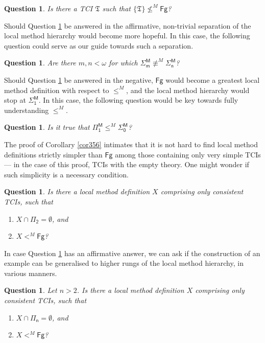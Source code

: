 \documentclass[12pt, twoside]{memoir}
\numberwithin{equation}{section}
\newtheorem{ques}[thm]{Question}
\theoremstyle{definition}
\theoremstyle{remark}
\theoremstyle{definition}
\theoremstyle{definition}
\theoremstyle{definition}
\theoremstyle{remark}
\begin{document}
\begin{ques}\label{q843}
Is there a TCI $\mathfrak{T}$ such that $\{\mathfrak{T}\} \not\leq^M \mathsf{Fg}$?
\end{ques}

Should Question \ref{q843} be answered in the affirmative, non-trivial separation of the local method hierarchy would become more hopeful. In this case, the following question could serve as our guide towards such a separation.

\begin{ques}\label{q841}
Are there $m, n < \omega$ for which $\mathsf{\Sigma^M_m} \not\equiv^M \mathsf{\Sigma^M_n}$?
\end{ques}

Should Question \ref{q843} be answered in the negative, $\mathsf{Fg}$ would become a greatest local method definition with respect to $\leq^M$, and the local method hierarchy would stop at $\mathsf{\Sigma^M_1}$. In this case, the following question would be key towards fully understanding $\leq^M$.

\begin{ques}\label{q842}
Is it true that $\mathsf{\Pi^M_1} \leq^M \mathsf{\Sigma^M_0}$?
\end{ques}

The proof of Corollary \ref{cor356} intimates that it is not hard to find local method definitions strictly simpler than $\mathsf{Fg}$ among those containing only very simple TCIs --- in the case of this proof, TCIs with the empty theory. One might wonder if such simplicity is a necessary condition.

\begin{ques}\label{q357}
Is there a local method definition $X$ comprising only consistent TCIs, such that
\begin{enumerate}[label=(\arabic*)]
    \item $X \cap \mathsf{\Pi_2} = \emptyset$, and
    \item $X <^M \mathsf{Fg}$?
\end{enumerate}
\end{ques}

In case Question \ref{q357} has an affirmative answer, we can ask if the construction of an example can be generalised to higher rungs of the local method hierarchy, in various manners.

\begin{ques}\label{q417}
Let $n > 2$. Is there a local method definition $X$ comprising only consistent TCIs, such that
\begin{enumerate}[label=(\arabic*)]
    \item $X \cap \mathsf{\Pi_n} = \emptyset$, and
    \item $X <^M \mathsf{Fg}$?
\end{enumerate}
\end{ques}
\end{document}
